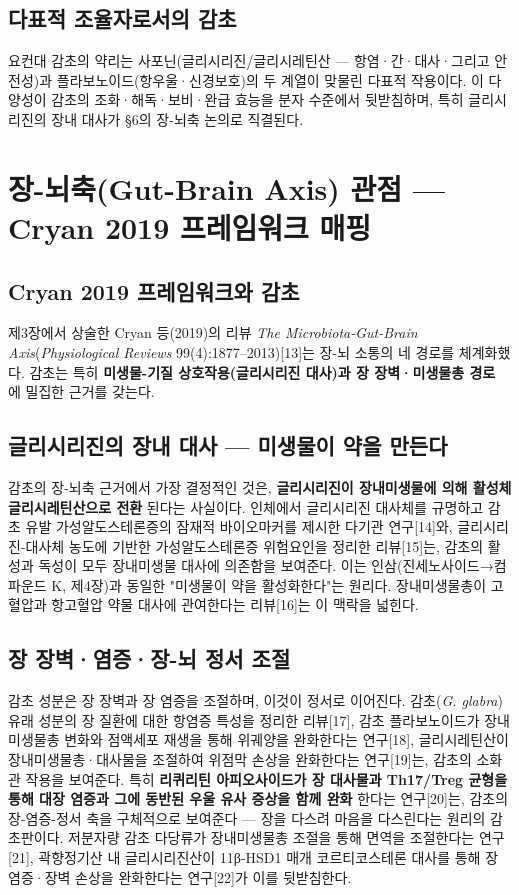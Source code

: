 \documentclass[11pt,oneside]{book}
\begin{document}
\subsection{다표적 조율자로서의 감초}
요컨대 감초의 약리는 사포닌(글리시리진/글리시레틴산 — 항염·간·대사·그리고 안전성)과 플라보노이드(항우울·신경보호)의 두 계열이 맞물린 다표적 작용이다. 이 다양성이 감초의 조화·해독·보비·완급 효능을 분자 수준에서 뒷받침하며, 특히 글리시리진의 장내 대사가 §6의 장-뇌축 논의로 직결된다.

\section{장-뇌축(Gut-Brain Axis) 관점 — Cryan 2019 프레임워크 매핑}
\subsection{Cryan 2019 프레임워크와 감초}
제3장에서 상술한 Cryan 등(2019)의 리뷰 \textit{The Microbiota-Gut-Brain Axis}(\textit{Physiological Reviews} 99(4):1877–2013)[13]는 장-뇌 소통의 네 경로를 체계화했다. 감초는 특히 \textbf{미생물-기질 상호작용(글리시리진 대사)과 장 장벽·미생물총 경로} 에 밀집한 근거를 갖는다.

\subsection{글리시리진의 장내 대사 — 미생물이 약을 만든다}
감초의 장-뇌축 근거에서 가장 결정적인 것은, \textbf{글리시리진이 장내미생물에 의해 활성체 글리시레틴산으로 전환} 된다는 사실이다. 인체에서 글리시리진 대사체를 규명하고 감초 유발 가성알도스테론증의 잠재적 바이오마커를 제시한 다기관 연구[14]와, 글리시리진-대사체 농도에 기반한 가성알도스테론증 위험요인을 정리한 리뷰[15]는, 감초의 활성과 독성이 모두 장내미생물 대사에 의존함을 보여준다. 이는 인삼(진세노사이드→컴파운드 K, 제4장)과 동일한 "미생물이 약을 활성화한다"는 원리다. 장내미생물총이 고혈압과 항고혈압 약물 대사에 관여한다는 리뷰[16]는 이 맥락을 넓힌다.

\subsection{장 장벽·염증·장-뇌 정서 조절}
감초 성분은 장 장벽과 장 염증을 조절하며, 이것이 정서로 이어진다. 감초(\textit{G. glabra}) 유래 성분의 장 질환에 대한 항염증 특성을 정리한 리뷰[17], 감초 플라보노이드가 장내미생물총 변화와 점액세포 재생을 통해 위궤양을 완화한다는 연구[18], 글리시레틴산이 장내미생물총·대사물을 조절하여 위점막 손상을 완화한다는 연구[19]는, 감초의 소화관 작용을 보여준다. 특히 \textbf{리퀴리틴 아피오사이드가 장 대사물과 Th17/Treg 균형을 통해 대장 염증과 그에 동반된 우울 유사 증상을 함께 완화} 한다는 연구[20]는, 감초의 장-염증-정서 축을 구체적으로 보여준다 — 장을 다스려 마음을 다스린다는 원리의 감초판이다. 저분자량 감초 다당류가 장내미생물총 조절을 통해 면역을 조절한다는 연구[21], 곽향정기산 내 글리시리진산이 11β-HSD1 매개 코르티코스테론 대사를 통해 장 염증·장벽 손상을 완화한다는 연구[22]가 이를 뒷받침한다.
\end{document}
